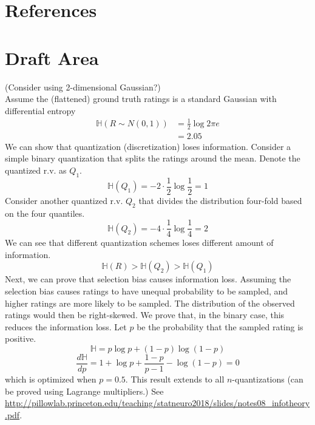 \documentclass{article}
\def\HH{\mathbb{H}}
\begin{document}
\section*{References}

\section{Draft Area}
 (Consider using 2-dimensional Gaussian?)\\
Assume the (flattened) ground truth ratings is a standard Gaussian with differential entropy
\begin{align} \HH(R\sim N(0, 1))
   & = \frac{1}{2}\log 2\pi e \\
   & = 2.05
\end{align}
We can show that quantization (discretization) loses information. Consider
a simple binary quantization that splits the ratings around the mean. Denote the quantized r.v. as $Q_1$.
\[ \HH(Q_1) = -2 \cdot \frac{1}{2} \log \frac{1}{2} = 1 \]
Consider another quantized r.v. $Q_2$ that divides the distribution four-fold based on the four quantiles.
\[ \HH(Q_2) = -4 \cdot \frac{1}{4} \log \frac{1}{4} = 2 \]
We can see that different quantization schemes loses different amount of information.
\[ \HH(R) > \HH(Q_2) > \HH(Q_1) \]
Next, we can prove that selection bias causes information loss. Assuming the selection bias causes ratings to have unequal probability to be sampled, and higher ratings are more likely to be sampled. The distribution of the observed ratings would then be right-skewed. We prove that, in the binary case, this reduces the information loss. Let $p$ be the probability that the sampled rating is positive.
\[\HH = p\log p + (1-p) \log (1-p) \]
\[ \frac{d\HH}{dp} = 1 + \log p + \frac{1-p}{p-1} - \log(1-p) = 0 \]
which is optimized when $p = 0.5$. This result extends to all $n$-quantizations (can be proved using Lagrange multipliers.) See \url{http://pillowlab.princeton.edu/teaching/statneuro2018/slides/notes08_infotheory.pdf}.



\end{document}

